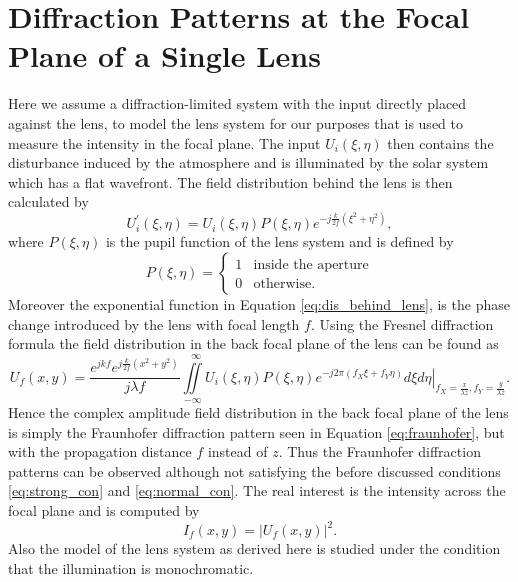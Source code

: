 \documentclass{article}
\begin{document}
\section{Diffraction Patterns at the Focal Plane of a Single Lens}
Here we assume a diffraction-limited system with the input directly placed against the lens, to model the lens system for our purposes that is used to measure the intensity in the focal plane. The input $U_i(\xi,\eta)$ then contains the disturbance induced by the atmosphere and is illuminated by the solar system which has a flat wavefront. The field distribution behind the lens is then calculated by
\begin{equation}
U^\prime_i(\xi,\eta)=U_i(\xi,\eta)P(\xi,\eta)e^{-j\frac{k}{2f}(\xi^2 + \eta^2)},
\label{eq:dis_behind_lens}
\end{equation}
where $P(\xi,\eta)$ is the pupil function of the lens system and is defined by
\begin{equation}
P(\xi,\eta)= \begin{cases} 1 & \text{inside the aperture} \\ 0 & \text{otherwise.} \end{cases}
\end{equation}
Moreover the exponential function in Equation \eqref{eq:dis_behind_lens}, is the phase change introduced by the lens with focal length $f$. Using the Fresnel diffraction formula the field distribution in the back focal plane of the lens can be found as
\begin{equation}
U_f(x,y)=\frac{e^{jkf}e^{j\frac{k}{2f}(x^2+y^2)}}{j\lambda f}\iint\limits_{-\infty}^{~~~\infty} \left. U_i(\xi,\eta)P(\xi,\eta)e^{-j2\pi(f_X\xi+f_Y\eta)}d\xi d\eta \right|_{f_X=\frac{x}{\lambda z},f_Y=\frac{y}{\lambda z}}.
\end{equation}
Hence the complex amplitude field distribution in the back focal plane of the lens is simply the Fraunhofer diffraction pattern seen in Equation \eqref{eq:fraunhofer}, but with the propagation distance $f$ instead of $z$. Thus the Fraunhofer diffraction patterns can be observed although not satisfying the before discussed conditions \eqref{eq:strong_con} and \eqref{eq:normal_con}. The real interest is the intensity across the focal plane and is computed by
\begin{equation}
I_f(x,y)=|U_f(x,y)|^2.
\end{equation}
Also the model of the lens system as derived here is studied under the condition that the illumination is monochromatic. 
\end{document}
